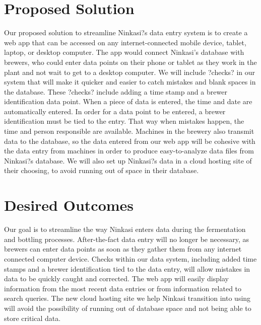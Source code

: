 \documentclass[draftclsnofoot, onecolumn, letterpaper, 10pt]{IEEEtran}
\begin{document}
\section{Proposed Solution}
Our proposed solution to streamline Ninkasi?s data entry system is to create a web app that can be accessed on any internet-connected mobile device, tablet, laptop, or desktop computer. The app would connect Ninkasi's database with brewers, who could enter data points on their phone or tablet as they work in the plant and not wait to get to a desktop computer. We will include ?checks? in our system that will make it quicker and easier to catch mistakes and blank spaces in the database. These ?checks? include adding a time stamp and a brewer identification data point. When a piece of data is entered, the time and date are automatically entered. In order for a data point to be entered, a brewer identification must be tied to the entry. That way when mistakes happen, the time and person responsible are available. Machines in the brewery also transmit data to the database, so the data entered from our web app will be cohesive with the data entry from machines in order to produce easy-to-analyze data files from Ninkasi?s database. We will also set up Ninkasi?s data in a cloud hosting site of their choosing, to avoid running out of space in their database. 
\section{Desired Outcomes}
Our goal is to streamline the way Ninkasi enters data during the fermentation and bottling processes. After-the-fact data entry will no longer be necessary, as brewers can enter data points as soon as they gather them from any internet connected computer device. Checks within our data system, including added time stamps and a brewer identification tied to the data entry, will allow mistakes in data to be quickly caught and corrected. The web app will easily display information from the most recent data entries or from information related to search queries. The new cloud hosting site we help Ninkasi transition into using will avoid the possibility of running out of database space and not being able to store critical data.
\end{document}
